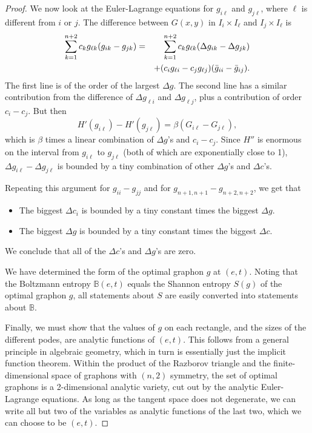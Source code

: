 \documentclass[12pt]{amsart}
\newcommand\be{\begin{equation}}
\newcommand\ee{\end{equation}}
\newcommand{\B}{\mathbb{B}}
\begin{document}
{\begin{proof}
We now look at the Euler-Lagrange equations for $g_{i\ell}$ and $g_{j\ell}$, 
where $\ell$ is different from $i$ or $j$. The difference between $G(x,y)$ in $I_i \times I_\ell$ and 
$I_j \times I_\ell$ is 
\begin{eqnarray} 
\sum_{k=1}^{n+2} c_k g_{\ell k} (g_{ik}-g_{jk}) & =&    \sum_{k=1}^{n+2} c_k g_{\ell k} (\Delta g_{ik}-\Delta g_{jk}) \cr 
&& + (c_i g_{\ell i} - c_j g_{\ell j})(\bar g_{ii} - \bar g_{ij}).
\end{eqnarray} 
The first line is of the order of the largest $\Delta g$. The second line has a similar contribution
from the difference of $\Delta g_{\ell i}$ and $\Delta g_{\ell j}$, plus a contribution of order 
$c_i - c_j$. But then 
\be H'(g_{i\ell}) - H'(g_{j\ell}) = \beta (G_{i\ell} - G_{j\ell}),\ee
which is $\beta$ times a linear combination of $\Delta g$'s and $c_i-c_j$. Since $H''$ is enormous on
the interval from $g_{i\ell}$ to $g_{j\ell}$ (both of which are exponentially close to 1), 
$\Delta g_{i\ell}-\Delta g_{j\ell}$ is bounded by a tiny combination of other $\Delta g$'s and $\Delta c$'s. 

Repeating this argument for $g_{ii} - g_{jj}$ and for $g_{n+1,n+1}-g_{n+2,n+2}$, we get that 
\begin{itemize}
\item The biggest $\Delta c_i$ is bounded by a tiny constant times the biggest $\Delta g$. 
\item The biggest $\Delta g$ is bounded by a tiny constant times the biggest $\Delta c$. 
\end{itemize}
We conclude that all of the $\Delta c$'s and $\Delta g$'s are zero. 

We have determined the form of the optimal graphon $g$ at $(e,t)$. 
Noting that the Boltzmann entropy $\B(e,t)$ equals the Shannon entropy 
$S(g)$ of the optimal graphon $g$, all statements about $S$ are easily converted into statements 
about $\B$. 

Finally, we must show that the values of $g$ on each rectangle, and 
the sizes of the different podes, are analytic functions of $(e,t)$. 
This follows from a general principle in algebraic geometry, which in
turn is essentially just the implicit function theorem. Within the
product of the Razborov triangle and the finite-dimensional space 
of graphons with $(n,2)$ symmetry, the set of optimal graphons is a 
2-dimensional analytic variety, cut out by the analytic Euler-Lagrange
equations. As long as the 
tangent space does not degenerate, we can write all but two of the 
variables as analytic functions of the last two, which we can
choose to be $(e,t)$. 


\end{proof}}
\end{document}
